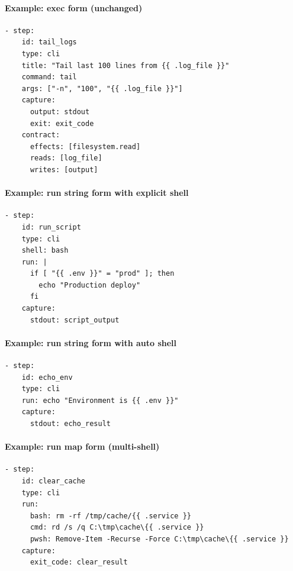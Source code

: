 \paragraph{Example: exec form (unchanged)}

\begin{verbatim}
- step:
    id: tail_logs
    type: cli
    title: "Tail last 100 lines from {{ .log_file }}"
    command: tail
    args: ["-n", "100", "{{ .log_file }}"]
    capture:
      output: stdout
      exit: exit_code
    contract:
      effects: [filesystem.read]
      reads: [log_file]
      writes: [output]
\end{verbatim}

\paragraph{Example: run string form with explicit shell}

\begin{verbatim}
- step:
    id: run_script
    type: cli
    shell: bash
    run: |
      if [ "{{ .env }}" = "prod" ]; then
        echo "Production deploy"
      fi
    capture:
      stdout: script_output
\end{verbatim}

\paragraph{Example: run string form with auto shell}

\begin{verbatim}
- step:
    id: echo_env
    type: cli
    run: echo "Environment is {{ .env }}"
    capture:
      stdout: echo_result
\end{verbatim}

\paragraph{Example: run map form (multi-shell)}

\begin{verbatim}
- step:
    id: clear_cache
    type: cli
    run:
      bash: rm -rf /tmp/cache/{{ .service }}
      cmd: rd /s /q C:\tmp\cache\{{ .service }}
      pwsh: Remove-Item -Recurse -Force C:\tmp\cache\{{ .service }}
    capture:
      exit_code: clear_result
\end{verbatim}

